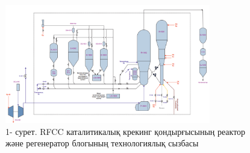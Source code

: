 \begin{figure}[H]
	\centering
	\includegraphics[width=0.8\textwidth]{media/ict/image86}
	\caption*{1- сурет. RFCC каталитикалық крекинг қондырғысының реактор және
регенератор блогының технологиялық сызбасы}
\end{figure}

